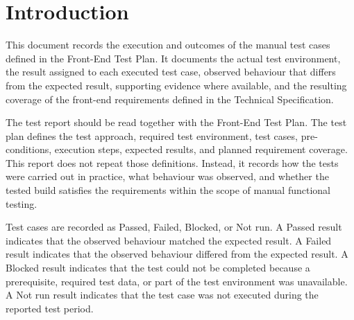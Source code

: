 \section{Introduction}\label{sec:hd-testreport-introduction}
This document records the execution and outcomes of the manual test cases defined in the \tradesq{} Front-End Test Plan. It documents the actual test environment, the result assigned to each executed test case, observed behaviour that differs from the expected result, supporting evidence where available, and the resulting coverage of the front-end requirements defined in the Technical Specification.

The test report should be read together with the \tradesq{} Front-End Test Plan. The test plan defines the test approach, required test environment, test cases, pre-conditions, execution steps, expected results, and planned requirement coverage. This report does not repeat those definitions. Instead, it records how the tests were carried out in practice, what behaviour was observed, and whether the tested build satisfies the requirements within the scope of manual functional testing.

Test cases are recorded as Passed, Failed, Blocked, or Not run. A Passed result indicates that the observed behaviour matched the expected result. A Failed result indicates that the observed behaviour differed from the expected result. A Blocked result indicates that the test could not be completed because a prerequisite, required test data, or part of the test environment was unavailable. A Not run result indicates that the test case was not executed during the reported test period.
